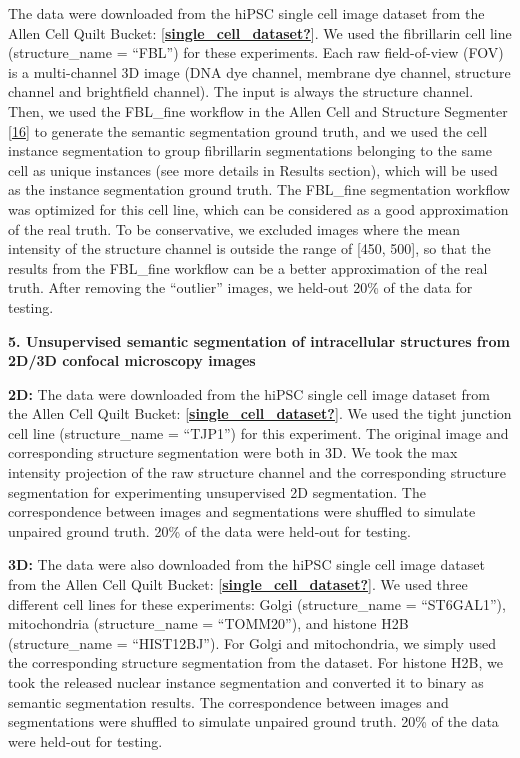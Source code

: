 The data were downloaded from the hiPSC single cell image dataset from the Allen Cell Quilt Bucket: {[}\protect\hyperlink{ref-single_cell_dataset}{\textbf{single\_cell\_dataset?}}{]}. We used the fibrillarin cell line (structure\_name = ``FBL'') for these experiments. Each raw field-of-view (FOV) is a multi-channel 3D image (DNA dye channel, membrane dye channel, structure channel and brightfield channel). The input is always the structure channel. Then, we used the FBL\_fine workflow in the Allen Cell and Structure Segmenter {[}\protect\hyperlink{ref-jM3v1UjQ}{16}{]} to generate the semantic segmentation ground truth, and we used the cell instance segmentation to group fibrillarin segmentations belonging to the same cell as unique instances (see more details in Results section), which will be used as the instance segmentation ground truth. The FBL\_fine segmentation workflow was optimized for this cell line, which can be considered as a good approximation of the real truth. To be conservative, we excluded images where the mean intensity of the structure channel is outside the range of {[}450, 500{]}, so that the results from the FBL\_fine workflow can be a better approximation of the real truth. After removing the ``outlier'' images, we held-out 20\% of the data for testing.

\textbf{5. Unsupervised semantic segmentation of intracellular structures from 2D/3D confocal microscopy images}

\textbf{2D:} The data were downloaded from the hiPSC single cell image dataset from the Allen Cell Quilt Bucket: {[}\protect\hyperlink{ref-single_cell_dataset}{\textbf{single\_cell\_dataset?}}{]}. We used the tight junction cell line (structure\_name = ``TJP1'') for this experiment. The original image and corresponding structure segmentation were both in 3D. We took the max intensity projection of the raw structure channel and the corresponding structure segmentation for experimenting unsupervised 2D segmentation. The correspondence between images and segmentations were shuffled to simulate unpaired ground truth. 20\% of the data were held-out for testing.

\textbf{3D:} The data were also downloaded from the hiPSC single cell image dataset from the Allen Cell Quilt Bucket: {[}\protect\hyperlink{ref-single_cell_dataset}{\textbf{single\_cell\_dataset?}}{]}. We used three different cell lines for these experiments: Golgi (structure\_name = ``ST6GAL1''), mitochondria (structure\_name = ``TOMM20''), and histone H2B (structure\_name = ``HIST12BJ''). For Golgi and mitochondria, we simply used the corresponding structure segmentation from the dataset. For histone H2B, we took the released nuclear instance segmentation and converted it to binary as semantic segmentation results. The correspondence between images and segmentations were shuffled to simulate unpaired ground truth. 20\% of the data were held-out for testing.

